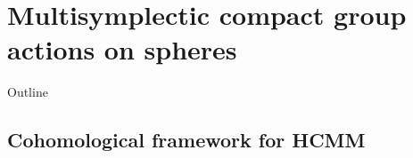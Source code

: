 \documentclass[handout,10pt]{beamer}
\newcommand{\checkpoint}[0]{
	\ifHandout

	\else
	\addtocounter{framenumber}{-1}
 	\begin{frame}{Outline}
  		\tableofcontents[currentsection]
	\end{frame}
	\fi
}
\begin{document}




\section{Multisymplectic compact group actions on spheres}
\checkpoint
\subsection{Cohomological framework for HCMM}
\end{document}
